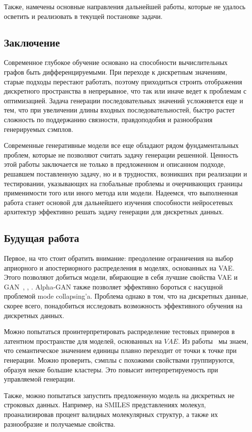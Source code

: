 \documentclass{spbau-diploma}
\begin{document}
Также, намечены основные направления дальнейшей работы, которые не удалось 
осветить и реализовать в текущей постановке задачи.

\subsection{Заключение}
Современное глубокое обучение основано на способности вычислительных графов
быть дифференцируемыми. При переходе к дискретным значениям, старые подходы
перестают работать, поэтому приходиться строить отображения дискретного 
пространства в непрерывное, что так или иначе ведет к проблемам с оптимизацией.
Задача генерации последовательных значений усложняется еще и тем, что 
при увеличении длины входных последовательностей, быстро растет сложность по 
поддержанию связности, правдоподобия и разнообразия генерируемых сэмплов.

Современные генеративные модели все еще обладают рядом фундаментальных проблем,
которые не позволяют считать задачу генерации решенной. Ценность этой работы 
заключается не только в предложенном и описанном подходе, решавшем 
поставленную задачу, но и в трудностях, возникших при реализации и  
тестировании, указывающих на глобальные проблемы и очерчивающих границы 
применимости того или иного метода или модели. Надеемся, что выполненная 
работа станет основой для дальнейшего изучения способности нейросетевых 
архитектур эффективно решать задачу генерации для дискретных данных.

\subsection{Будущая работа}
Первое, на что стоит обратить внимание: преодоление ограничения на выбор 
априорного и апостериорного распределения в моделях, основанных на VAE. Этого 
позволяют добиться модели, вбирающие в себя лучшие свойства VAE и 
GAN~\cite{vetrovgan}, \cite{aae}, \cite{alphagan}. Alpha-GAN также позволяет
эффективно бороться с насущной проблемой mode collapsing'a. Проблема однако в 
том, что на дискретных данные, скорее всего, понадобиться исследовать 
возможность эффективного обучения на дискретных данных.

Можно попытаться проинтерпретировать распределение 
тестовых примеров в латентном пространстве для моделей, основанных на $VAE$. Из
работы~\cite{text_vae} мы знаем, что семантическое значением единицы плавно 
переходит от точки к точке при генерации. Можно проверить, сэмплы с похожими
свойствами группируются, образуя некие большие кластеры. Это повысит 
интерпретируемость при управляемой генерации.

Также, можно попытаться запустить предложенную модель на дискретных не 
строковых данных. Например, на SMILES представлениях молекул, проанализировав 
процент валидных молекулярных структур, а также их разнообразие и получаемые 
свойства.



\end{document}
